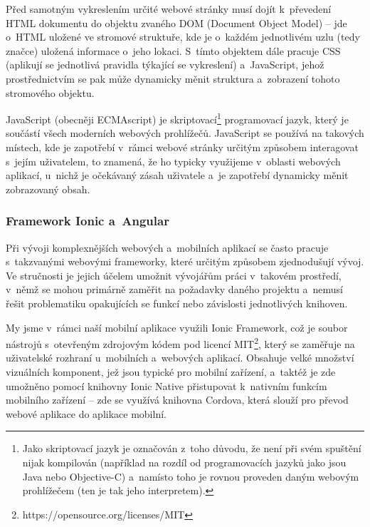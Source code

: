 Před samotným vykreslením určité webové stránky musí dojít k~převedení
HTML dokumentu do objektu zvaného DOM (Document Object Model) -- jde
o~HTML uložené ve stromové struktuře, kde je o~každém jednotlivém uzlu
(tedy značce) uložená informace o~jeho lokaci. S~tímto objektem dále
pracuje CSS (aplikují se jednotlivá pravidla týkající se vykreslení)
a~JavaScript, jehož prostřednictvím se pak může dynamicky měnit struktura
a~zobrazení tohoto stromového objektu.~\parencite{howbrowserswork}

JavaScript (obecněji ECMAscript) je
skriptovací\footnote{Jako skriptovací jazyk je označován z~toho důvodu, že není při svém spuštění nijak kompilován (například na rozdíl od programovacích jazyků jako jsou Java nebo Objective-C) a~namísto toho je rovnou proveden daným webovým prohlížečem (ten je tak jeho interpretem).}
programovací jazyk, který je součástí všech moderních webových
prohlížečů. JavaScript se používá na takových místech, kde je zapotřebí
v~rámci webové stránky určitým způsobem interagovat s~jejím uživatelem,
to znamená, že ho typicky využijeme v~oblasti webových aplikací, u~nichž
je očekávaný zásah uživatele a~je zapotřebí dynamicky měnit zobrazovaný
obsah.~\parencite{javascript}

\hypertarget{framework-ionic-a-angular}{%
\subsubsection{Framework Ionic a~Angular}\label{framework-ionic-a-angular}}

Při vývoji komplexnějších webových a~mobilních aplikací se často pracuje
s~takzvanými webovými frameworky, které určitým způsobem zjednodušují
vývoj. Ve stručnosti je jejich účelem umožnit vývojářům práci v~takovém
prostředí, v~němž se mohou primárně zaměřit na požadavky daného projektu
a~nemusí řešit problematiku opakujících se funkcí nebo závislosti
jednotlivých knihoven.

My jsme v~rámci naší mobilní aplikace využili Ionic Framework, což je
soubor nástrojů s~otevřeným zdrojovým kódem pod licencí
MIT\footnote{https://opensource.org/licenses/MIT}, který se zaměřuje na
uživatelské rozhraní u~mobilních a~webových aplikací. Obsahuje velké
množství vizuálních komponent, jež jsou typické pro mobilní zařízení,
a~taktéž je zde umožněno pomocí knihovny Ionic Native přistupovat
k~nativním funkcím mobilního zařízení -- zde se využívá knihovna Cordova,
která slouží pro převod webové aplikace do aplikace mobilní.
\parencite{cordova}

